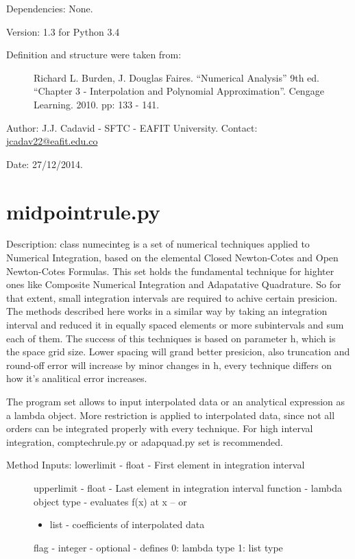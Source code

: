 \documentclass[letterpaper,10pt,oneside]{sphinxmanual}
\theoremstyle{plain}%
\theoremstyle{definition}%
\theoremstyle{remark}%
\begin{document}
Dependencies: None.

Version: 1.3 for Python 3.4
\begin{description}
\item[{Definition and structure were taken from:}] \leavevmode
Richard L. Burden, J. Douglas Faires. ``Numerical Analysis'' 9th ed.
``Chapter 3 - Interpolation and Polynomial Approximation''. 
Cengage Learning. 2010. pp: 133 - 141.

\end{description}

Author: J.J. Cadavid - SFTC - EAFIT University.
Contact: \href{mailto:jcadav22@eafit.edu.co}{jcadav22@eafit.edu.co}

Date: 27/12/2014.


\section{midpointrule.py}
\label{code:module-midpointrule}\label{code:midpointrule-py}
Description: class numecinteg is a set of numerical techniques applied to
Numerical Integration, based on the elemental Closed Newton-Cotes and
Open Newton-Cotes Formulas. This set holds the fundamental technique for
highter ones like Composite Numerical Integration and Adapatative Quadrature.
So for that extent, small integration intervals are required to achive certain
presicion. The methods described here works in a similar way by taking an
integration interval and reduced it in equally spaced elements or more 
subintervals and sum each of them. The success of this techniques is based
on parameter h, which is the space grid size. Lower spacing will grand better
presicion, also truncation and round-off error will increase by minor changes
in h, every technique differs on how it's analitical error increases.

The program set allows to input interpolated data or an analytical expression
as a lambda object. More restriction is applied to interpolated data, since
not all orders can be integrated properly with every technique. For high 
interval integration, comptechrule.py or adapquad.py set is recommended.
\begin{description}
\item[{Method Inputs: lowerlimit - float - First element in integration interval}] \leavevmode
upperlimit - float - Last element in integration interval
function - lambda object type - evaluates f(x) at x -- or
\begin{itemize}
\item {} 
list - coefficients of interpolated data

\end{itemize}

flag - integer - optional - defines 0: lambda type 1: list type

\end{description}
\end{document}
